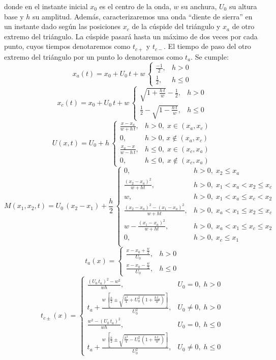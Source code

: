 \documentclass[a4paper,10pt]{report}
\newcommand{\C}[1]{\left[#1\right]}
\newcommand{\HALF}{\frac{1}{2}}
\newcommand{\PA}[1]{\left(#1\right)}
\begin{document}
donde en el instante inicial $x_0$ es el centro de la onda, $w$ su anchura, $U_0$ su altura base y $h$ su amplitud. Además, caracterizaremos una onda ``diente de sierra'' en un instante dado según las posiciones $x_c$ de la cúspide del triángulo y $x_a$ de otro extremo del triángulo. La cúspide pasará hasta un máximo de dos veces por cada punto, cuyos tiempos denotaremos como $t_{c+}$ y $t_{c-}$. El tiempo de paso del otro extremo del triángulo por un punto lo denotaremos como $t_a$. Se cumple:
\[
	x_a(t)=x_0+U_0\,t+w\,\left\{\begin{array}{lc}
	\frac{-1}{2},&h>0\\
	\HALF,&h\leq 0\end{array}\right.
\]
\[
	x_c(t)=x_0+U_0\,t+w\,\left\{\begin{array}{lc}
	\sqrt{1+\frac{h\,t}{w}}-\HALF,&h>0\\
	\HALF-\sqrt{1-\frac{h\,t}{w}},&h\leq 0\end{array}\right.
\]
\[
	U(x,t)=U_0+h\,\left\{\begin{array}{lc}
	\frac{x-x_a}{w+h\,t},&h>0,\;x\in\PA{x_a,x_c}\\
	0,&h>0,\,x\notin\PA{x_a,x_c}\\
	\frac{x_a-x}{w-h\,t},&h\leq 0,\;x\in\PA{x_c,x_a}\\
	0,&h\leq 0,\;x\notin\PA{x_c,x_a}\end{array}\right.
\]
\[
	M\PA{x_1,x_2,t}=U_0\,\PA{x_2-x_1}+\frac{h}{2}\,\left\{\begin{array}{lc}
	0,&h>0,\;x_2\leq x_a\\
	\frac{\PA{x_2-x_a}^2}{w+ht},&h>0,\;x_1<x_a<x_2\leq x_c\\
	w,&h>0,\;x_1<x_a\leq x_c<x_2\\
	\frac{\PA{x_2-x_a}^2-\PA{x_1-x_a}^2}{w+ht},&h>0,\;x_a<x_1\leq x_2\leq x_c\\
	w-\frac{\PA{x_1-x_a}^2}{w+ht},&h>0,\;x_a<x_1\leq x_c\leq x_2\\
	0,&h>0,\;x_c\leq x_1\\
	\end{array}\right.
\]
\[
	t_a(x)=\left\{\begin{array}{lc}
	\frac{x-x_0+\frac{w}{2}}{U_0},&h>0\\
	\frac{x-x_0-\frac{w}{2}}{U_0},&h\leq 0\end{array}\right.
\]
\[
	t_{c\pm}(x)=\left\{\begin{array}{lc}
	\frac{\PA{U_0\,t_a}^2-w^2}{wh},&U_0=0,\;h>0\\
	t_a+\frac{w\,\C{\frac{h}{2}\pm\sqrt{\frac{h^2}{4}+
	U_0^2\,\PA{1+\frac{h\,t_a}{w}}}}}{U_0^2},&U_0\neq 0,\;h>0\\
	\frac{w^2-\PA{U_0\,t_a}^2}{wh},&U_0=0,\;h\leq 0\\
	t_a+\frac{w\,\C{\frac{h}{2}\pm\sqrt{\frac{h^2}{4}-
	U_0^2\,\PA{1+\frac{h\,t_a}{w}}}}}{U_0^2},&U_0\neq 0,\;h\leq 0
	\end{array}\right.
\]
\end{document}
